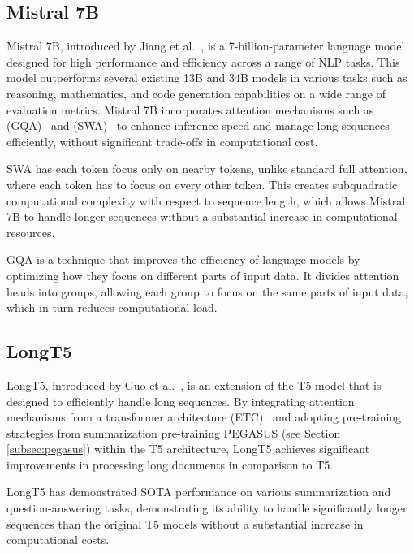 \documentclass[english, ba, kiv, he, iso690numb, pdf, viewonly]{fasthesis}
\begin{document}
	\subsection{Mistral 7B}
	Mistral 7B, introduced by Jiang et al.~\cite{jiang2023mistral}, is a 7-billion-parameter language model designed for high performance and efficiency across a range of NLP tasks. This model outperforms several existing 13B and 34B models in various tasks such as reasoning, mathematics, and code generation capabilities on a wide range of evaluation metrics. Mistral 7B incorporates attention mechanisms such as  (GQA)~\cite{ainslie2023gqa} and  (SWA)~\cite{beltagy2020longformer} to enhance inference speed and manage long sequences efficiently, without significant trade-offs in computational cost. 
	
	SWA has each token focus only on nearby tokens, unlike standard full attention, where each token has to focus on every other token. This creates subquadratic computational complexity with respect to sequence length, which allows Mistral 7B to handle longer sequences without a substantial increase in computational resources.
	
	GQA is a technique that improves the efficiency of language models by optimizing how they focus on different parts of input data. It divides attention heads into groups, allowing each group to focus on the same parts of input data, which in turn reduces computational load.
	
	\subsection{LongT5}
	LongT5, introduced by Guo et al.~\cite{guo2022longt5}, is an extension of the T5 model that is designed to efficiently handle long sequences. By integrating attention mechanisms from a transformer architecture  (ETC)~\cite{ainslie2020etc} and adopting pre-training strategies from summarization pre-training PEGASUS (see Section \ref{subsec:pegasus}) within the T5 architecture, LongT5 achieves significant improvements in processing long documents in comparison to T5. 
	
	LongT5 has demonstrated SOTA performance on various summarization and question-answering tasks, demonstrating its ability to handle significantly longer sequences than the original T5 models without a substantial increase in computational costs.
	
\end{document}
